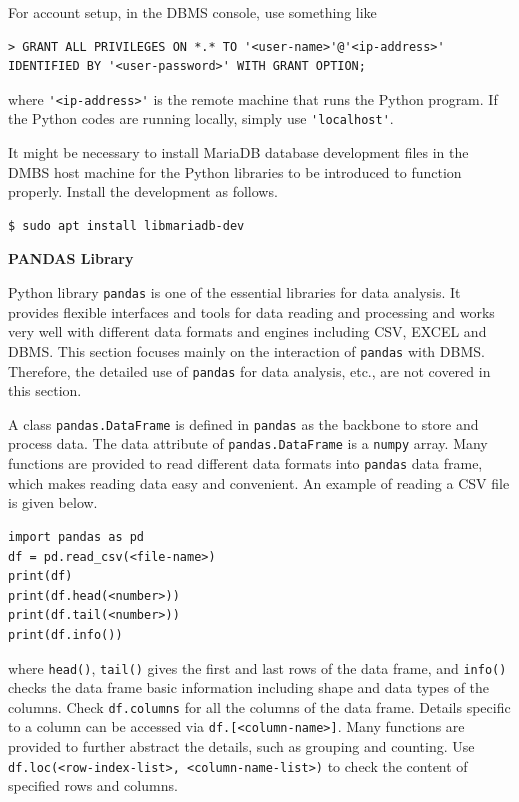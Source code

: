 For account setup, in the DBMS console, use something like
\begin{lstlisting}
> GRANT ALL PRIVILEGES ON *.* TO '<user-name>'@'<ip-address>' IDENTIFIED BY '<user-password>' WITH GRANT OPTION;
\end{lstlisting}
where \verb|'<ip-address>'| is the remote machine that runs the Python program. If the Python codes are running locally, simply use \verb|'localhost'|.

It might be necessary to install MariaDB database development files in the DMBS host machine for the Python libraries to be introduced to function properly. Install the development as follows.
\begin{lstlisting}
$ sudo apt install libmariadb-dev
\end{lstlisting}

\vspace{0.1in}
\noindent \textbf{PANDAS Library}
\vspace{0.1in}

Python library \verb|pandas| is one of the essential libraries for data analysis. It provides flexible interfaces and tools for data reading and processing and works very well with different data formats and engines including CSV, EXCEL and DBMS. This section focuses mainly on the interaction of \verb|pandas| with DBMS. Therefore, the detailed use of \verb|pandas| for data analysis, etc., are not covered in this section.

A class \verb|pandas.DataFrame| is defined in \verb|pandas| as the backbone to store and process data. The data attribute of \verb|pandas.DataFrame| is a \verb|numpy| array. Many functions are provided to read different data formats into \verb|pandas| data frame, which makes reading data easy and convenient. An example of reading a CSV file is given below.
\begin{lstlisting}
import pandas as pd
df = pd.read_csv(<file-name>)
print(df)
print(df.head(<number>))
print(df.tail(<number>))
print(df.info())
\end{lstlisting}
where \verb|head()|, \verb|tail()| gives the first and last rows of the data frame, and \verb|info()| checks the data frame basic information including shape and data types of the columns. Check \verb|df.columns| for all the columns of the data frame. Details specific to a column can be accessed via \verb|df.[<column-name>]|. Many functions are provided to further abstract the details, such as grouping and counting. Use \verb|df.loc(<row-index-list>, <column-name-list>)| to check the content of specified rows and columns.

